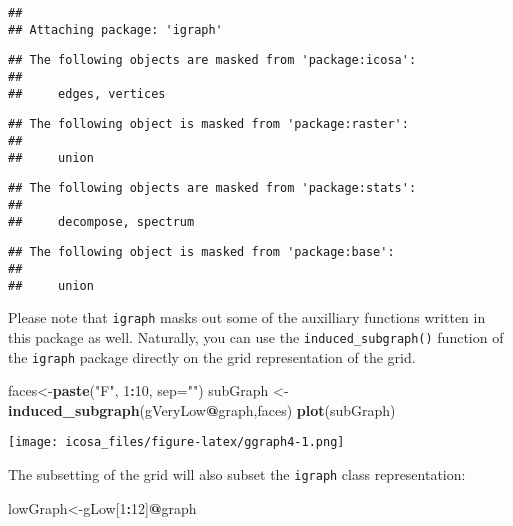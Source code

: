\documentclass[]{article}
\newenvironment{Shaded}{\begin{snugshade}}{\end{snugshade}}
\newcommand{\KeywordTok}[1]{\textcolor[rgb]{0.13,0.29,0.53}{\textbf{#1}}}
\newcommand{\DataTypeTok}[1]{\textcolor[rgb]{0.13,0.29,0.53}{#1}}
\newcommand{\DecValTok}[1]{\textcolor[rgb]{0.00,0.00,0.81}{#1}}
\newcommand{\StringTok}[1]{\textcolor[rgb]{0.31,0.60,0.02}{#1}}
\newcommand{\OperatorTok}[1]{\textcolor[rgb]{0.81,0.36,0.00}{\textbf{#1}}}
\newcommand{\NormalTok}[1]{#1}
\begin{document}
\begin{verbatim}
## 
## Attaching package: 'igraph'
\end{verbatim}

\begin{verbatim}
## The following objects are masked from 'package:icosa':
## 
##     edges, vertices
\end{verbatim}

\begin{verbatim}
## The following object is masked from 'package:raster':
## 
##     union
\end{verbatim}

\begin{verbatim}
## The following objects are masked from 'package:stats':
## 
##     decompose, spectrum
\end{verbatim}

\begin{verbatim}
## The following object is masked from 'package:base':
## 
##     union
\end{verbatim}

Please note that \texttt{igraph} masks out some of the auxilliary
functions written in this package as well. Naturally, you can use the
\texttt{induced\_subgraph()} function of the \texttt{igraph} package
directly on the grid representation of the grid.

\begin{Shaded}
\begin{Highlighting}[]
\NormalTok{faces<-}\KeywordTok{paste}\NormalTok{(}\StringTok{"F"}\NormalTok{, }\DecValTok{1}\OperatorTok{:}\DecValTok{10}\NormalTok{, }\DataTypeTok{sep=}\StringTok{""}\NormalTok{)}
\NormalTok{subGraph <-}\StringTok{ }\KeywordTok{induced_subgraph}\NormalTok{(gVeryLow}\OperatorTok{@}\NormalTok{graph,faces) }
\KeywordTok{plot}\NormalTok{(subGraph)}
\end{Highlighting}
\end{Shaded}

\texttt{[image: icosa\_files/figure-latex/ggraph4-1.png]}

The subsetting of the grid will also subset the \texttt{igraph} class
representation:

\begin{Shaded}
\begin{Highlighting}[]
\NormalTok{lowGraph<-gLow[}\DecValTok{1}\OperatorTok{:}\DecValTok{12}\NormalTok{]}\OperatorTok{@}\NormalTok{graph}
\end{Highlighting}
\end{Shaded}
\end{document}
